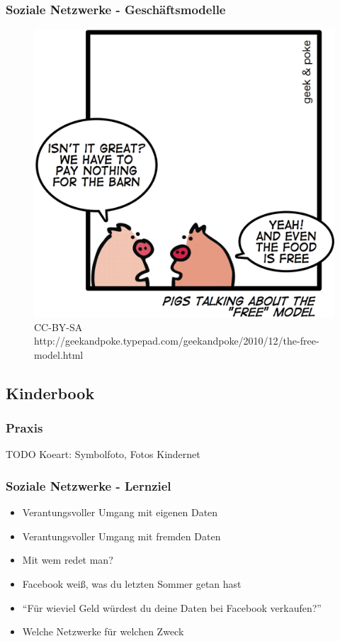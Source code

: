 \documentclass{beamer}
\begin{document}
\begin{frame}
  \frametitle{Soziale Netzwerke - Geschäftsmodelle}
  \begin{figure}
    \includegraphics[height=0.6\textheight]{img/business_pigs.jpg}
    \caption{CC-BY-SA http://geekandpoke.typepad.com/geekandpoke/2010/12/the-free-model.html}
  \end{figure}
\end{frame}

\subsection{Kinderbook}

\begin{frame}
  \frametitle{Praxis}
  TODO Koeart: Symbolfoto, Fotos Kindernet
\end{frame}

\begin{frame}
  \frametitle{Soziale Netzwerke - Lernziel}
  \begin{itemize}
    \item<2-> Verantungsvoller Umgang mit eigenen Daten
    \item<3-> Verantungsvoller Umgang mit fremden Daten
    \item<4-> Mit wem redet man?
    \item<5-> Facebook weiß, was du letzten Sommer getan hast
    \item<6-> "`Für wieviel Geld würdest du deine Daten bei Facebook verkaufen?"'
    \item<7-> Welche Netzwerke für welchen Zweck
  \end{itemize}
\end{frame}
\end{document}
